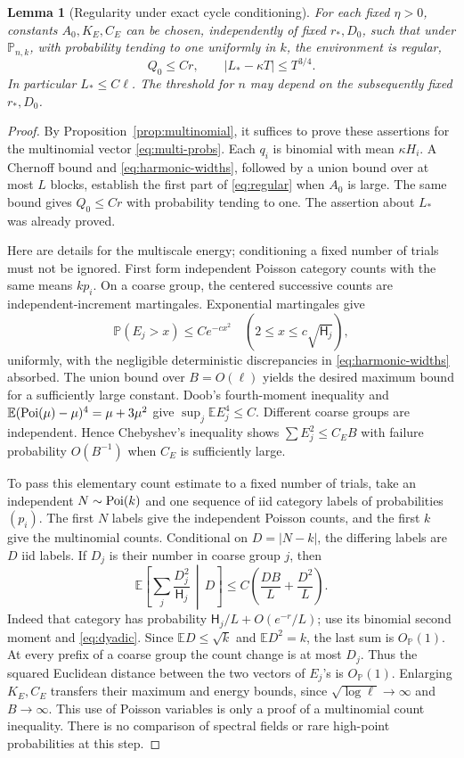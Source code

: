 \documentclass[11pt]{article}
\newtheorem{lemma}[theorem]{Lemma}
\theoremstyle{definition}\newtheorem{definition}[theorem]{Definition}
\theoremstyle{remark}\newtheorem{remark}[theorem]{Remark}
\newcommand{\E}{\mathbb E}\newcommand{\Pp}{\mathbb P}
\numberwithin{equation}{section}\allowdisplaybreaks
\begin{document}
\begin{lemma}[Regularity under exact cycle conditioning]\label{lem:regular}
For each fixed $\eta>0$, constants $A_0,K_E,C_E$ can be chosen, independently
of fixed $r_*,D_0$, such that under $\Pp_{n,k}$, with probability tending
to one uniformly in $k$, the environment is regular,
\[
 Q_0\le C r,\qquad |L_*-\kappa T|\le T^{3/4}.
\]
In particular $L_*\le C\ell$. The threshold for $n$ may depend on the
subsequently fixed $r_*,D_0$.
\end{lemma}
\begin{proof}
By Proposition~\ref{prop:multinomial}, it suffices to prove these assertions
for the multinomial vector \eqref{eq:multi-probs}. Each $q_i$ is binomial
with mean $\kappa H_i$. A Chernoff bound and \eqref{eq:harmonic-widths},
followed by a union bound over at most $L$ blocks, establish the first
part of \eqref{eq:regular} when $A_0$ is large. The same bound gives
$Q_0\le Cr$ with probability tending to one. The assertion about $L_*$
was already proved.

Here are details for the multiscale energy; conditioning a fixed number
of trials must not be ignored. First form independent Poisson category
counts with the same means $k p_i$. On a coarse group, the centered
successive counts are independent-increment martingales. Exponential
martingales give
\[
 \Pp(E_j>x)\le C e^{-cx^2}
 \quad(2\le x\le c\sqrt{\mathsf H_j}),
\]
uniformly, with the negligible deterministic discrepancies in
\eqref{eq:harmonic-widths} absorbed. The union bound over $B=O(\ell)$
yields the desired maximum bound for a sufficiently large constant.
Doob's fourth-moment inequality and
$\E(\Poi(\mu)-\mu)^4=\mu+3\mu^2$ give
$\sup_j\E E_j^4\le C$. Different coarse groups are independent.
Hence Chebyshev's inequality shows $\sum E_j^2\le C_E B$ with failure
probability $O(B^{-1})$ when $C_E$ is sufficiently large.

To pass this elementary count estimate to a fixed number of trials,
take an independent $N\sim\operatorname{Poi}(k)$ and one sequence of iid category
labels of probabilities $(p_i)$. The first $N$ labels give the independent
Poisson counts, and the first $k$ give the multinomial counts. Conditional
on $D=|N-k|$, the differing labels are $D$ iid labels. If $D_j$ is their
number in coarse group $j$, then
\[
 \E\left[\sum_j\frac{D_j^2}{\mathsf H_j}\,\middle|\,D\right]
 \le C\left(\frac{DB}{L}+\frac{D^2}{L}\right).
\]
Indeed that category has probability
$\mathsf H_j/L+O(e^{-r}/L)$; use its binomial second moment and
\eqref{eq:dyadic}. Since $\E D\le\sqrt k$ and $\E D^2=k$, the last
sum is $O_{\Pp}(1)$. At every prefix of a coarse group the count change
is at most $D_j$. Thus the squared Euclidean distance between the two
vectors of $E_j$'s is $O_{\Pp}(1)$. Enlarging $K_E,C_E$ transfers their
maximum and energy bounds, since $\sqrt{\log\ell}\to\infty$ and
$B\to\infty$. This use of Poisson variables is only a proof of a
multinomial count inequality. There is no comparison of spectral fields
or rare high-point probabilities at this step.


\end{proof}
\end{document}
